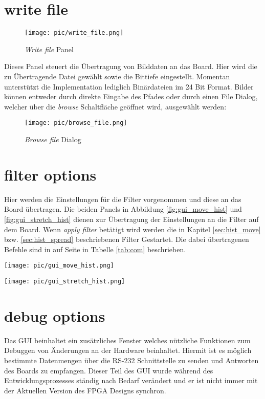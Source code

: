 \documentclass[%
  paper=A4, %
  pagesize, %
  12pt,
  ngerman   %
]{scrreprt}  %
\begin{document}
\section{write file}
\begin{figure}[ht]
	\centering
  \texttt{[image: pic/write\_file.png]}
	\caption{\emph{Write file} Panel}
	\label{gui_write_file}
\end{figure}


Dieses Panel steuert die Übertragung von Bilddaten an das Board. Hier wird die zu Übertragende Datei gewählt sowie die Bittiefe eingestellt. Momentan unterstützt die Implementation lediglich Binärdateien im 24 Bit Format. Bilder können entweder durch direkte Eingabe des Pfades oder durch einen File Dialog, welcher über die \emph{browse} Schaltfläche geöffnet wird, ausgewählt werden:

\begin{figure}[ht]
	\centering
  \texttt{[image: pic/browse\_file.png]}
	\caption{\emph{Browse file} Dialog}
	\label{gui_write_file}
\end{figure}


\section{filter options}
Hier werden die Einstellungen für die Filter vorgenommen und diese an das Board übertragen. Die beiden Panels in Abbildung \ref{fig:gui_move_hist} und \ref{fig:gui_stretch_hist} dienen zur Übertragung der Einstellungen an die Filter auf dem Board. Wenn \emph{apply filter} betätigt wird werden die in Kapitel \ref{sec:hist_move} bzw. \ref{sec:hist_spread} beschriebenen Filter Gestartet. Die dabei übertragenen Befehle sind in auf Seite \pageref{tab:com} in Tabelle \ref{tab:com} beschrieben.

\noindent\begin{minipage}{.45\textwidth}
  \centering
  \texttt{[image: pic/gui\_move\_hist.png]}
  \label{fig:gui_move_hist}         
\end{minipage}
\begin{minipage}{.45\textwidth}
  \centering
  \texttt{[image: pic/gui\_stretch\_hist.png]}
  \label{fig:gui_stretch_hist}            
\end{minipage}


\section{debug options}
Das GUI beinhaltet ein zusätzliches Fenster welches nützliche Funktionen zum Debuggen von Änderungen an der Hardware beinhaltet. Hiermit ist es möglich bestimmte Datenmengen über die RS-232 Schnittstelle zu senden und Antworten des Boards zu empfangen. Dieser Teil des GUI wurde während des Entwicklungsprozesses ständig nach Bedarf verändert und er ist nicht immer mit der Aktuellen Version des FPGA Designs synchron.
\end{document}
